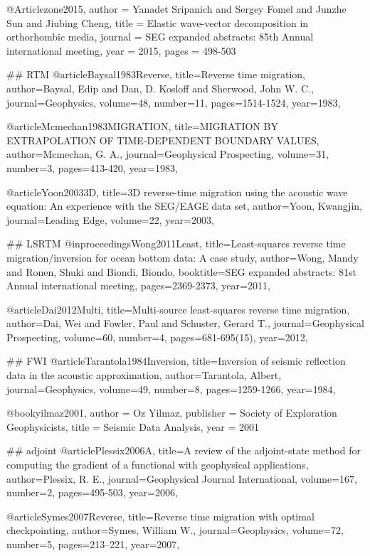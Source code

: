 @Article{zone2015,
  author = 	 {Yanadet Sripanich and Sergey Fomel and Junzhe Sun and Jiubing Cheng},
  title = 	 {Elastic wave-vector decomposition in orthorhombic media},
  journal = 	 {SEG expanded abstracts: 85th Annual international meeting},
  year = 	 2015,
  pages =	 {498-503}
}


## RTM
@article{Baysal1983Reverse,
  title={Reverse time migration},
  author={Baysal, Edip and Dan, D. Kosloff and Sherwood, John W. C.},
  journal={Geophysics},
  volume={48},
  number={11},
  pages={1514-1524},
  year={1983},
}

@article{Mcmechan1983MIGRATION,
  title={MIGRATION BY EXTRAPOLATION OF TIME‐DEPENDENT BOUNDARY VALUES},
  author={Mcmechan, G. A.},
  journal={Geophysical Prospecting},
  volume={31},
  number={3},
  pages={413-420},
  year={1983},
}

@article{Yoon20033D,
  title={3{D} reverse-time migration using the acoustic wave equation: An experience with the SEG/EAGE data set},
  author={Yoon, Kwangjin},
  journal={Leading Edge},
  volume={22},
  year={2003},
}

## LSRTM
@inproceedings{Wong2011Least,
  title={Least‐squares reverse time migration/inversion for ocean bottom data: A case study},
  author={Wong, Mandy and Ronen, Shuki and Biondi, Biondo},
  booktitle={SEG expanded abstracts: 81st Annual international meeting},
  pages={2369-2373},
  year={2011},
}

@article{Dai2012Multi,
  title={Multi-source least-squares reverse time migration},
  author={Dai, Wei and Fowler, Paul and Schuster, Gerard T.},
  journal={Geophysical Prospecting},
  volume={60},
  number={4},
  pages={681-695(15)},
  year={2012},
}

## FWI
@article{Tarantola1984Inversion,
  title={Inversion of seismic reflection data in the acoustic approximation},
  author={Tarantola, Albert},
  journal={Geophysics},
  volume={49},
  number={8},
  pages={1259-1266},
  year={1984},
}

@book{yilmaz2001,
   author = {Oz Yilmaz},
   publisher = {Society of Exploration Geophysicists},
   title = {Seismic Data Analysis},
   year = {2001}
}

## adjoint
@article{Plessix2006A,
  title={A review of the adjoint-state method for computing the gradient of a functional with geophysical applications},
  author={Plessix, R. E.},
  journal={Geophysical Journal International},
  volume={167},
  number={2},
  pages={495-503},
  year={2006},
}

@article{Symes2007Reverse,
  title={Reverse time migration with optimal checkpointing},
  author={Symes, William W.},
  journal={Geophysics},
  volume={72},
  number={5},
  pages={213--221},
  year={2007},
}


